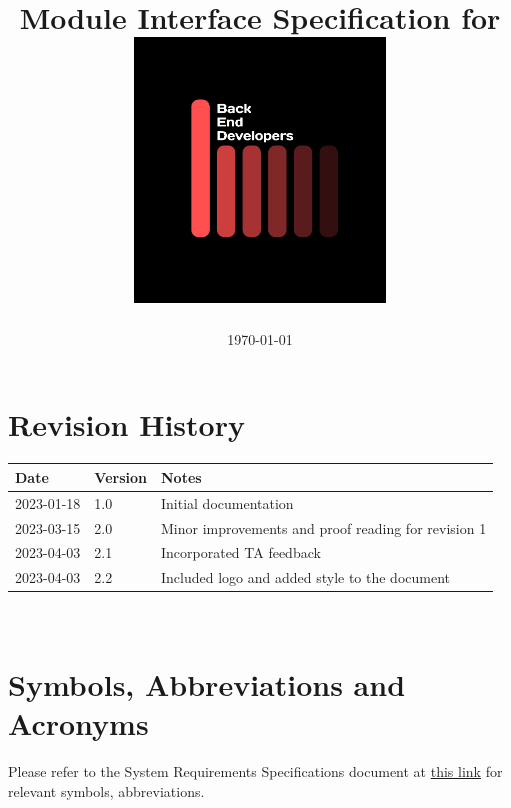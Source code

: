 \documentclass[12pt, titlepage]{article}
\begin{document}
\title{\textbf{Module Interface Specification for \progname{}} \\ \vspace{2cm} \includegraphics[width=0.5\textwidth]{../../logo.jpg}}
\author{\authname}

\date{\today}
 \pagecolor{black}\afterpage{\nopagecolor}
\color{white}\maketitle

\color{black}

\section{Revision History}

\begin{tabularx}{\textwidth}{p{3cm}p{2cm}X}
\toprule {\bf Date} & {\bf Version} & {\bf Notes}\\
\midrule
2023-01-18 & 1.0 & Initial documentation\\
2023-03-15 & 2.0 & Minor improvements and proof reading for revision 1\\
2023-04-03 & 2.1 & Incorporated TA feedback\\
2023-04-03 & 2.2 & Included logo and added style to the document\\
\bottomrule
\end{tabularx}

~\newpage

\section{Symbols, Abbreviations and Acronyms}

Please refer to the System Requirements Specifications document at \href{https://github.com/zakerl/Capstone_Project/blob/desDoc_Labeeb/docs/SRS/SRS.pdf}{this link} for relevant symbols, abbreviations.\\
\end{document}
